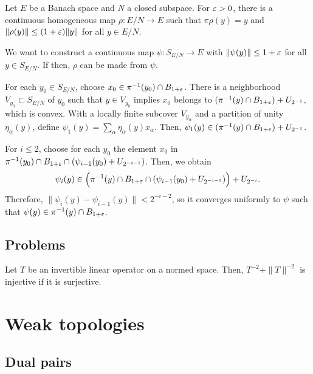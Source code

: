 \documentclass{../../large}
\begin{document}
\begin{prb}
Let $E$ be a Banach space and $N$ a closed subspace.
For $\varepsilon>0$, there is a continuous homogeneous map $\rho:E/N\to E$ such that $\pi\rho(y)=y$ and $\|\rho(y)\|\le(1+\varepsilon)\|y\|$ for all $y\in E/N$.
\end{prb}
\begin{pf}
We want to construct a continuous map $\psi:S_{E/N}\to E$ with $\|\psi(y)\|\le1+\varepsilon$ for all $y\in S_{E/N}$.
If then, $\rho$ can be made from $\psi$.

For each $y_0\in S_{E/N}$, choose $x_0\in\pi^{-1}(y_0)\cap B_{1+\varepsilon}$.
There is a neighborhood $V_{y_0}\subset S_{E/N}$ of $y_0$ such that $y\in V_{y_0}$ implies $x_0$ belongs to $(\pi^{-1}(y)\cap B_{1+\varepsilon})+U_{2^{-1}}$, which is convex.
With a locally finite subcover $V_{y_\alpha}$ and a partition of unity $\eta_\alpha(y)$, define $\psi_1(y)=\sum_\alpha\eta_\alpha(y)x_\alpha$.
Then, $\psi_1(y)\in(\pi^{-1}(y)\cap B_{1+\varepsilon})+U_{2^{-1}}$.

For $i\le2$, choose for each $y_0$ the element $x_0$ in $\pi^{-1}(y_0)\cap B_{1+\varepsilon}\cap(\psi_{i-1}(y_0)+U_{2^{-{i-1}}})$.
Then, we obtain
\[\psi_i(y)\in\Bigl(\pi^{-1}(y)\cap B_{1+\varepsilon}\cap(\psi_{i-1}(y_0)+U_{2^{-{i-1}}})\Bigr)+U_{2^{-i}}.\]
Therefore, $\|\psi_i(y)-\psi_{i-1}(y)\|<2^{-{i-2}}$, so it converges uniformly to $\psi$ such that $\psi(y)\in\pi^{-1}(y)\cap B_{1+\varepsilon}$.
\end{pf}

\section*{Problems}
\begin{prb}
Let $T$ be an invertible linear operator on a normed space.
Then, $T^{-2}+\|T\|^{-2}$ is injective if it is surjective.
\end{prb}
















\chapter{Weak topologies}
\section{Dual pairs}
\end{document}
